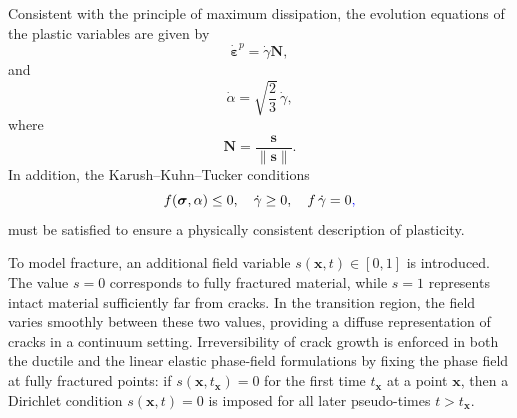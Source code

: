 \documentclass[pdflatex,sn-mathphys-num]{sn-jnl}%
\newcommand{\changed}[1]{\begingroup\color{blue}#1\endgroup}
\theoremstyle{thmstyleone}%
\theoremstyle{thmstyletwo}%
\theoremstyle{thmstylethree}%
\begin{document}
Consistent with the principle of maximum dissipation, the evolution equations of the plastic variables are given by
\begin{equation}
    \dot{\boldsymbol{\varepsilon}}^p = \dot{\gamma}\boldsymbol{N},
    \label{eq:evolution_eps_p}
\end{equation}
and
\begin{equation}
    \dot{\alpha} = \sqrt{\dfrac{2}{3}}\,\dot{\gamma},
    \label{eq:evolution_alpha}
\end{equation}
where
\begin{equation}
    \boldsymbol{N} = \dfrac{\boldsymbol{s}}{\|\boldsymbol{s}\|}.
\end{equation}
In addition, the Karush--Kuhn--Tucker conditions
\begin{equation}
    f(\boldsymbol{\sigma},\alpha) \le 0, 
    \quad \dot{\gamma} \ge 0, 
    \quad f\,\dot{\gamma} = 0\changed{,}
\end{equation}
must be satisfied to ensure a physically consistent description of plasticity.

To model fracture, an additional field variable $s(\boldsymbol{x},t) \in [0,1]$ is introduced. 
The value $s=0$ corresponds to fully fractured material, while $s=1$ represents intact material sufficiently far from cracks. 
In the transition region, the field varies smoothly between these two values, providing a diffuse representation of cracks in a continuum setting.
Irreversibility of crack growth is enforced in both the ductile and the linear elastic phase-field formulations by fixing the phase field at fully fractured points: if $s(\boldsymbol{x},t_{\boldsymbol{x}})=0$ for the first time $t_{\boldsymbol{x}}$ at a point $\boldsymbol{x}$, then a Dirichlet condition $s(\boldsymbol{x},t)=0$ is imposed for all later pseudo-times $t>t_{\boldsymbol{x}}$.
\end{document}
